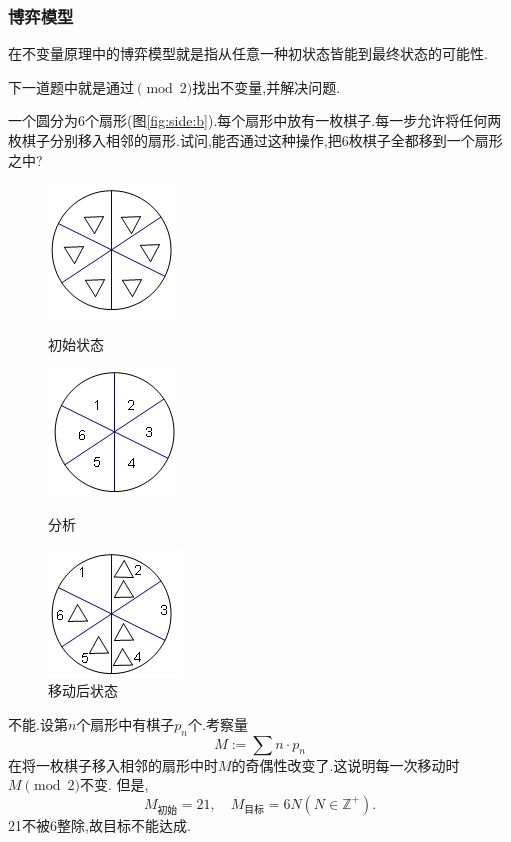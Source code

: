 \subsubsection{博弈模型}
在不变量原理中的博弈模型就是指从任意一种初状态皆能到最终状态的可能性.

下一道题中就是通过$\pmod 2$找出不变量,并解决问题.
\begin{problem}
    一个圆分为6个扇形(图\ref{fig:side:b}).每个扇形中放有一枚棋子.每一步允许将任何两枚棋子分别移入相邻的扇形.试问,能否通过这种操作,把6枚棋子全都移到一个扇形之中?
    \begin{figure}
        \begin{minipage}[t]{0.5\linewidth}
        \centering
        \includegraphics{graphics/circ1.png}
        \caption{初始状态}
        \label{fig:side:a}
        \end{minipage}%
        \begin{minipage}[t]{0.5\linewidth}
        \centering
        \includegraphics{graphics/circ2.png}
        \caption{分析}
        \label{fig:side:b}
        \end{minipage}
        \begin{minipage}[t]{0.5\linewidth}
            \centering
            \includegraphics{graphics/circ3.png}
            \caption{移动后状态}
            \label{fig:side:c}
            \end{minipage}
        \end{figure}
        
\end{problem}
\begin{solution}
    不能.设第$n$个扇形中有棋子$p_n$个.考察量$$
        M:=\sum n\cdot p_n
    $$
    在将一枚棋子移入相邻的扇形中时$M$的奇偶性改变了.这说明每一次移动时$M\pmod2$不变.
    但是,$$M_\text{初始}=21,\quad M_\text{目标}=6N(N\in\mathbb{Z}^{+}).$$21不被6整除,故目标不能达成.
\end{solution}
